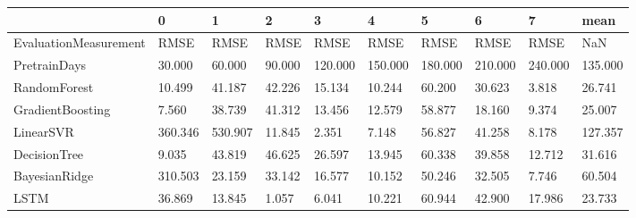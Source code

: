 \begin{tabular}{llllllllll}
\toprule
{} &       0 &       1 &      2 &       3 &       4 &       5 &       6 &       7 &    mean \\
\midrule
EvaluationMeasurement &    RMSE &    RMSE &   RMSE &    RMSE &    RMSE &    RMSE &    RMSE &    RMSE &     NaN \\
PretrainDays          &  30.000 &  60.000 & 90.000 & 120.000 & 150.000 & 180.000 & 210.000 & 240.000 & 135.000 \\
RandomForest          &  10.499 &  41.187 & 42.226 &  15.134 &  10.244 &  60.200 &  30.623 &   3.818 &  26.741 \\
GradientBoosting      &   7.560 &  38.739 & 41.312 &  13.456 &  12.579 &  58.877 &  18.160 &   9.374 &  25.007 \\
LinearSVR             & 360.346 & 530.907 & 11.845 &   2.351 &   7.148 &  56.827 &  41.258 &   8.178 & 127.357 \\
DecisionTree          &   9.035 &  43.819 & 46.625 &  26.597 &  13.945 &  60.338 &  39.858 &  12.712 &  31.616 \\
BayesianRidge         & 310.503 &  23.159 & 33.142 &  16.577 &  10.152 &  50.246 &  32.505 &   7.746 &  60.504 \\
LSTM                  &  36.869 &  13.845 &  1.057 &   6.041 &  10.221 &  60.944 &  42.900 &  17.986 &  23.733 \\
\bottomrule
\end{tabular}
